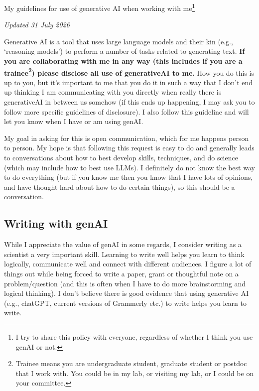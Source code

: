 \documentclass[11pt]{article}
\begin{document}

\renewcommand{\refname}{\CHead{}}


{\Large My guidelines for use of generative AI when working with me}\footnote{I try to share this policy with everyone, regardless of whether I think you use genAI or not.}


\emph{Updated 31 July 2026} %

Generative AI is a tool that uses large language models and their kin (e.g., `reasoning models') to perform a number of tasks related to generating text. {\bf If you are collaborating with me in any way (this includes if you are a trainee\footnote{Trainee means you are undergraduate student, graduate student or postdoc that I work with. You could be in my lab, or visiting my lab, or I could be on your committee.}) please disclose all use of generativeAI to me.} How you do this is up to you, but it's important to me that you do it in such a way that I don't end up thinking I am communicating with you directly when really there is generativeAI in between us somehow (if this ends up happening, I may ask you to follow more specific guidelines of disclosure). I also follow this guideline and will let you know when I have or am using genAI. 

My goal in asking for this is open communication, which for me happens person to person. My hope is that following this request is easy to do and generally leads to conversations about how to best develop skills, techniques, and do science (which may include how to best use LLMs). I definitely do not know the best way to do everything (but if you know me then you know that I have lots of opinions, and have thought hard about how to do certain things), so this should be a conversation. 


\subsection*{Writing with genAI}

While I appreciate the value of genAI in some regards, I consider writing as a scientist a very important skill. Learning to write well helps you learn to think logically, communicate well and connect with different audiences. I figure a lot of things out while being forced to write a paper, grant or thoughtful note on a problem/question (and this is often when I have to do more brainstorming and logical thinking). I don't believe there is good evidence that using generative AI (e.g., chatGPT, current versions of Grammerly etc.) to write helps you learn to write. 
\end{document}
